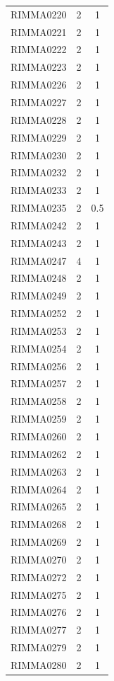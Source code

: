 \documentclass[11pt]{article}
\begin{document}
\begin{linenumbers}
\begin{flushleft}
\begin{table}[htbp]
\begin{tabular}{ccc}
    RIMMA0220 & 2     & 1 \\
    RIMMA0221 & 2     & 1 \\
    RIMMA0222 & 2     & 1 \\
    RIMMA0223 & 2     & 1 \\
    RIMMA0226 & 2     & 1 \\
    RIMMA0227 & 2     & 1 \\
    RIMMA0228 & 2     & 1 \\
    RIMMA0229 & 2     & 1 \\
    RIMMA0230 & 2     & 1 \\
    RIMMA0232 & 2     & 1 \\
    RIMMA0233 & 2     & 1 \\
    RIMMA0235 & 2     & 0.5 \\
    RIMMA0242 & 2     & 1 \\
    RIMMA0243 & 2     & 1 \\
    RIMMA0247 & 4     & 1 \\
    RIMMA0248 & 2     & 1 \\
    RIMMA0249 & 2     & 1 \\
    RIMMA0252 & 2     & 1 \\
    RIMMA0253 & 2     & 1 \\
    RIMMA0254 & 2     & 1 \\
    RIMMA0256 & 2     & 1 \\
    RIMMA0257 & 2     & 1 \\
    RIMMA0258 & 2     & 1 \\
    RIMMA0259 & 2     & 1 \\
    RIMMA0260 & 2     & 1 \\
    RIMMA0262 & 2     & 1 \\
    RIMMA0263 & 2     & 1 \\
    RIMMA0264 & 2     & 1 \\
    RIMMA0265 & 2     & 1 \\
    RIMMA0268 & 2     & 1 \\
    RIMMA0269 & 2     & 1 \\
    RIMMA0270 & 2     & 1 \\
    RIMMA0272 & 2     & 1 \\
    RIMMA0275 & 2     & 1 \\
    RIMMA0276 & 2     & 1 \\
    RIMMA0277 & 2     & 1 \\
    RIMMA0279 & 2     & 1 \\
    RIMMA0280 & 2     & 1 \\

\end{tabular}
\end{table}
\end{flushleft}
\end{linenumbers}
\end{document}
